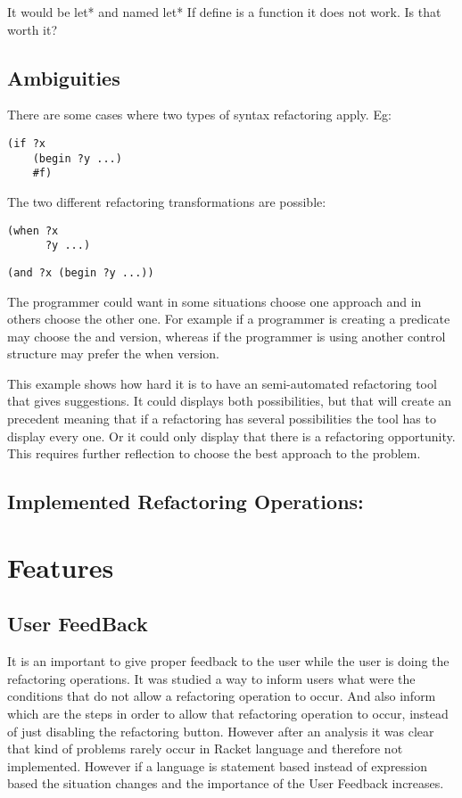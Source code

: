 It would be let* and named let* If define is a function it does not work.
Is that worth it?

\subsection{Ambiguities}
There are some cases where two types of syntax refactoring apply.
Eg:
\begin{lstlisting}[basicstyle=\ttfamily, caption="Example"]
(if ?x
    (begin ?y ...)
    #f)
\end{lstlisting}
The two different refactoring transformations are possible:
\begin{lstlisting}[basicstyle=\ttfamily, caption="Example"]
(when ?x
      ?y ...)
\end{lstlisting}

\begin{lstlisting}[basicstyle=\ttfamily, caption="Example"]
(and ?x (begin ?y ...))
\end{lstlisting}

The programmer could want in some situations choose one approach and in others
choose the other one. For example if a programmer is creating a predicate may
choose the and version, whereas if the programmer is using another control structure
may prefer the when version.

This example shows how hard it is to have an semi-automated refactoring tool
that gives suggestions.
It could displays both possibilities, but that will create an precedent meaning
that if a refactoring has several possibilities the tool has to display every one.
Or it could only display that there is a refactoring opportunity.
This requires further reflection to choose the best approach to the problem.


\subsection{Implemented Refactoring Operations:}

\section{Features}

\subsection{User FeedBack}
It is an important to give proper feedback to the user while the user is doing
the refactoring operations.
It was studied a way to inform users what were the conditions that do not allow
a refactoring operation to occur.
And also inform which are the steps in order to allow that refactoring operation to occur,
instead of just disabling the refactoring button.
However after an analysis it was clear that kind of problems rarely occur
in Racket language and therefore not implemented.
However if a language is statement based instead of expression based the situation changes
and the importance of the User Feedback increases.

